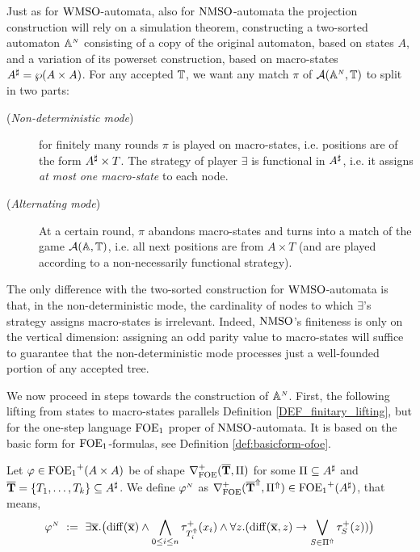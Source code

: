 Just as for $\mathrm{WMSO}$-automata, also for $\mathrm{NMSO}$-automata the projection construction will rely on a simulation theorem, constructing a two-sorted automaton $\mathbb{A}^{{\scriptscriptstyle N}}$ consisting of a copy of the original automaton, based on states $A$, and a variation of its powerset construction, based on macro-states $A^{\sharp} = \wp(A \times A)$. For any accepted $\mathbb{T}$, we want any match $\pi$ of $\mathcal{A}(\mathbb{A}^{{\scriptscriptstyle N}},\mathbb{T})$ to split in two parts:
\begin{description}
  \item[(\textit{Non-deterministic mode})] for finitely many rounds $\pi$ is played on macro-states, i.e. positions are of the form $A^{\sharp} \times T$. The strategy of player $\exists$ is functional in $A^{\sharp}$, i.e. it assigns \emph{at most one macro-state} to each node.
  \item[(\textit{Alternating mode})] At a certain round, $\pi$ abandons macro-states and turns into a match of the game $\mathcal{A}(\mathbb{A},\mathbb{T})$, i.e. all next positions are from $A \times T$ (and are played according to a non-necessarily functional strategy). %
\end{description}
The only difference with the two-sorted construction for $\mathrm{WMSO}$-automata is that, in the non-deterministic mode, the cardinality of nodes to which $\exists$'s strategy assigns macro-states is irrelevant. Indeed, $\mathrm{NMSO}$'s finiteness is only on the vertical dimension: assigning an odd parity value to macro-states will suffice to guarantee that the non-deterministic mode processes just a well-founded portion of any accepted tree.

We now proceed in steps towards the construction of $\mathbb{A}^{{\scriptscriptstyle N}}$. First, the following lifting from states to macro-states parallels Definition \ref{DEF_finitary_lifting}, but for the one-step language $\mathrm{FOE}_1$ proper of $\mathrm{NMSO}$-automata. It is based on the basic form for $\mathrm{FOE}_1$-formulas, see Definition \ref{def:basicform-ofoe}.

\begin{definition}\label{DEF_noetherian_lifting}
Let $\varphi \in {\ensuremath{\mathrm{FOE}_1}}^+(A \times A)$ be of shape $\nabla^+_{\mathrm{FOE}}(\overline{{\mathbf{T}}},\Pi)$ for some $\Pi \subseteq A^{\sharp}$ and $\overline{{\mathbf{T}}} = \{T_1,\dots,T_k\} \subseteq A^{\sharp}$. We define $\varphi^{{\scriptscriptstyle N}}$ as $\nabla^+_{\mathrm{FOE}}(\overline{{\mathbf{T}}}^{\Uparrow},\Pi^{\Uparrow}) \in {\ensuremath{\mathrm{FOE}_1}}^+(A^{\sharp} )$, that means,
\begin{equation}\label{eq:unfoldingNablaofoe}
\varphi^{\noet} \ \df \ 
    \exists \vlist{x}.\big(\arediff{\vlist{x}} \land \bigwedge_{0 \leq i \leq n} \tau^+_{\lift{T}_i}(x_i)
\land 
    \forall z.(\arediff{\vlist{x},z} \lthen \bigvee_{S\in \lift{\Pi} } \tau^+_S(z))\big)
\end{equation}
\end{definition}


